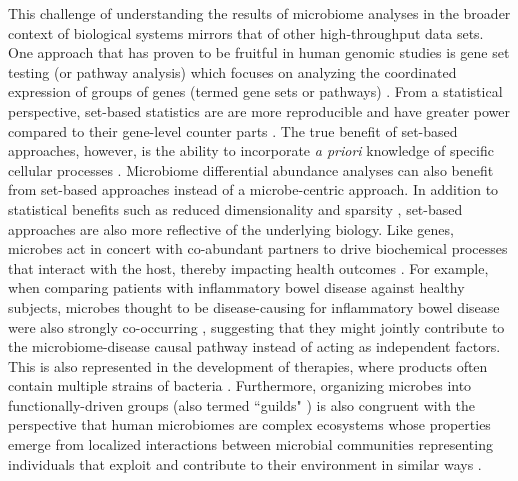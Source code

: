 This challenge of understanding the results of microbiome analyses in the broader context of biological systems mirrors that of other high-throughput data sets. One approach that has proven to be fruitful in human genomic studies is gene set testing (or pathway analysis) which focuses on analyzing the coordinated expression of groups of genes (termed gene sets or pathways) \cite{maleki2020gene}. From a statistical perspective, set-based statistics are are more reproducible and have greater power compared to their gene-level counter parts \cite{goeman2007analyzing}. The true benefit of set-based approaches, however, is the ability to incorporate \textit{a priori} knowledge of specific cellular processes \cite{liberzon2015molecular}. Microbiome differential abundance analyses can also benefit from set-based approaches instead of a microbe-centric approach. In addition to statistical benefits such as reduced dimensionality and sparsity \cite{nguyen2021cbea, kou2020microbeset}, set-based approaches are also more reflective of the underlying biology. Like genes, microbes act in concert with co-abundant partners to drive biochemical processes that interact with the host, thereby impacting health outcomes \cite{wu2021guildbased}. For example, when comparing patients with inflammatory bowel disease against healthy subjects, microbes thought to be disease-causing for inflammatory bowel disease were also strongly co-occurring \cite{gevers2014treatmentnaive}, suggesting that they might jointly contribute to the microbiome-disease causal pathway instead of acting as independent factors. This is also represented in the development of therapies, where products often contain multiple strains of bacteria \cite{berg2020microbiome, durack2019gut}. Furthermore, organizing microbes into functionally-driven groups (also termed ``guilds" \cite{wu2021guildbased}) is also congruent with the perspective that human microbiomes are complex ecosystems whose properties emerge from localized interactions between microbial communities representing individuals that exploit and contribute to their environment in similar ways \cite{faust2012microbial}.  

